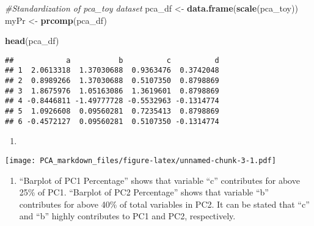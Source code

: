 \documentclass[]{article}
\newenvironment{Shaded}{\begin{snugshade}}{\end{snugshade}}
\newcommand{\CommentTok}[1]{\textcolor[rgb]{0.56,0.35,0.01}{\textit{#1}}}
\newcommand{\DataTypeTok}[1]{\textcolor[rgb]{0.13,0.29,0.53}{#1}}
\newcommand{\DecValTok}[1]{\textcolor[rgb]{0.00,0.00,0.81}{#1}}
\newcommand{\FloatTok}[1]{\textcolor[rgb]{0.00,0.00,0.81}{#1}}
\newcommand{\KeywordTok}[1]{\textcolor[rgb]{0.13,0.29,0.53}{\textbf{#1}}}
\newcommand{\NormalTok}[1]{#1}
\newcommand{\OperatorTok}[1]{\textcolor[rgb]{0.81,0.36,0.00}{\textbf{#1}}}
\newcommand{\StringTok}[1]{\textcolor[rgb]{0.31,0.60,0.02}{#1}}
\providecommand{\tightlist}{%
  \setlength{\itemsep}{0pt}\setlength{\parskip}{0pt}}
\begin{document}
\begin{Shaded}
\begin{Highlighting}[]
\CommentTok{#Standardization of pca_toy dataset}
\NormalTok{pca_df <-}\StringTok{ }\KeywordTok{data.frame}\NormalTok{(}\KeywordTok{scale}\NormalTok{(pca_toy))}
\NormalTok{myPr <-}\StringTok{ }\KeywordTok{prcomp}\NormalTok{(pca_df)}

\KeywordTok{head}\NormalTok{(pca_df)}
\end{Highlighting}
\end{Shaded}

\begin{verbatim}
##            a           b          c          d
## 1  2.0613318  1.37030688  0.9363476  0.3742048
## 2  0.8989266  1.37030688  0.5107350  0.8798869
## 3  1.8675976  1.05163086  1.3619601  0.8798869
## 4 -0.8446811 -1.49777728 -0.5532963 -0.1314774
## 5  1.0926608  0.09560281  0.7235413  0.8798869
## 6 -0.4572127  0.09560281  0.5107350 -0.1314774
\end{verbatim}

\begin{enumerate}
\def\labelenumi{(\alph{enumi})}
\setcounter{enumi}{1}
\item
\end{enumerate}

\begin{Shaded}
\end{Shaded}

\texttt{[image: PCA\_markdown\_files/figure-latex/unnamed-chunk-3-1.pdf]}

\begin{enumerate}
\def\labelenumi{(\alph{enumi})}
\setcounter{enumi}{2}
\tightlist
\item
  ``Barplot of PC1 Percentage'' shows that variable ``c'' contributes
  for above 25\% of PC1. ``Barplot of PC2 Percentage'' shows that
  variable ``b'' contributes for above 40\% of total variables in PC2.
  It can be stated that ``c'' and ``b'' highly contributes to PC1 and
  PC2, respectively.
\end{enumerate}
\end{document}
